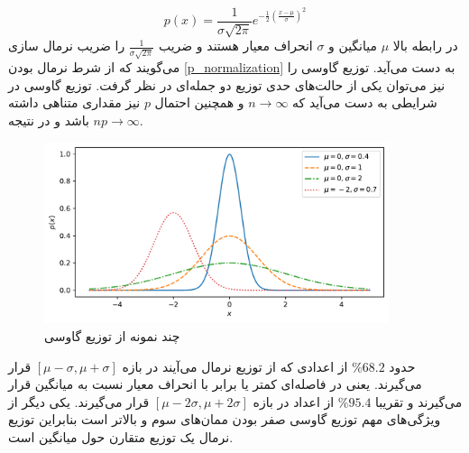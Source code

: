 \begin{equation}
    p(x) = \frac{1}{\sigma \sqrt{2 \pi}} e^{-\frac{1}{2}(\frac{x-\mu}{\sigma})^{2}}
    \label{normal_dist}
\end{equation}
در رابطه بالا $\mu$ میانگین و $\sigma$ انحراف معیار هستند و ضریب $\frac{1}{\sigma \sqrt{2 \pi}}$ را ضریب نرمال سازی می‌گویند که از شرط نرمال بودن \ref{p_normalization} به دست می‌آید.
توزیع گاوسی را نیز می‌توان یکی از حالت‌های حدی توزیع دو جمله‌ای در نظر گرفت. توزیع گاوسی در شرایطی به دست می‌آید که $n \rightarrow \infty$ و همچنین احتمال $p$ نیز مقداری متناهی داشته باشد و در نتیجه $np \rightarrow \infty$.
\begin{figure}[htb]
    \centering
    \includegraphics[width=0.9\textwidth]{images/normal.pdf}
    \caption{چند نمونه از توزیع گاوسی} %
    \par\medskip
\captionsetup{justification=centering}
\end{figure}
\FloatBarrier
حدود $\%68.2$ از اعدادی که از توزیع نرمال می‌آیند در بازه $[\mu-\sigma, \mu+\sigma]$ قرار می‌گیرند. 
 یعنی در فاصله‌ای کمتر یا برابر با انحراف معیار نسبت به میانگین قرار می‌گیرند 
و تقریبا $\%95.4$ از اعداد در بازه $[\mu-2\sigma, \mu+2\sigma]$ قرار می‌گیرند.
یکی دیگر از ویژگی‌های مهم توزیع گاوسی صفر بودن ممان‌های سوم و بالاتر است بنابراین توزیع نرمال یک توزیع متقارن حول میانگین است. 

